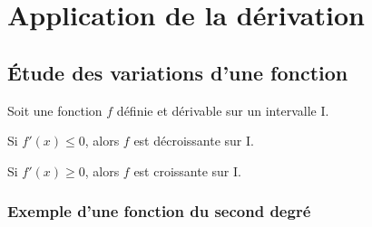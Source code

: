\chapter{Application de la dérivation}
\thispagestyle{fancy}

\section{Étude des variations d'une fonction}

\begin{bthm}
	Soit une fonction $f$ définie et dérivable sur un intervalle I.
	\begin{itemProp}
		\item Si $f'(x)\leq 0$, alors $f$ est décroissante sur I.
		\item Si $f'(x)\geq 0$, alors $f$ est croissante sur I.
	\end{itemProp}
\end{bthm}

\subsection{Exemple d'une fonction du second degré}

